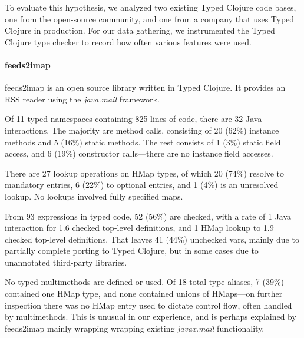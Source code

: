 To evaluate this hypothesis, we analyzed two existing Typed Clojure
code bases, one from the open-source community, and one from a company
that uses Typed Clojure in production. For our data gathering, we
instrumented the Typed Clojure type checker to record how often
various features were used. 

\paragraph{feeds2imap}
feeds2imap is an open source library written in Typed Clojure. It provides an
RSS reader using the \emph{java.mail} framework.

Of 11 typed namespaces containing 825 lines of code,
there are 32 Java interactions.
The majority are method calls, consisting of 
20 (62\%) instance methods and 5 (16\%) static methods.
The rest consists of 1 (3\%) static field access, and
6 (19\%) constructor calls---there are no instance field
accesses.

There are 27 lookup operations on HMap types, of which 20 (74\%) resolve to
mandatory entries, 6 (22\%) to optional entries,
and 1 (4\%) is an unresolved lookup. 
No lookups involved fully specified maps.

From 93  expressions in typed code, 52 (56\%) are checked,
with a rate of 1
Java interaction for 1.6 checked top-level definitions, and
1 HMap lookup to 1.9 checked top-level definitions.
That leaves 41 (44\%) unchecked vars, mainly due to partially complete 
porting to Typed Clojure, but in some cases due to unannotated third-party 
libraries.

No typed multimethods are defined or used. 
Of 18 total type aliases,
7 (39\%) contained one HMap type, and none contained unions of HMaps---on further
inspection there was no HMap entry used to dictate control flow, often
handled by multimethods.
This is unusual in our experience, and
is perhaps explained by feeds2imap mainly wrapping
wrapping existing \emph{javax.mail} functionality.

